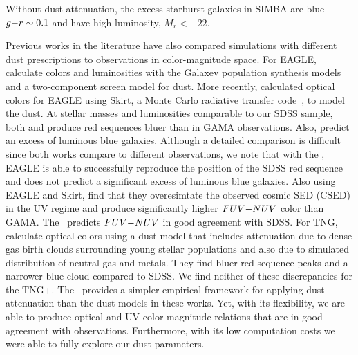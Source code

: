 Without dust attenuation, the excess starburst galaxies in SIMBA are blue
$g{-}r\sim0.1$ and have high luminosity, $M_r < -22$.

Previous works in the literature have also compared simulations with different
dust prescriptions to observations in color-magnitude space. For EAGLE, 
\cite{trayford2015} calculate colors and luminosities with the {\sc Galaxev}
population synthesis models and a two-component screen model for dust. More
recently, \cite{trayford2017} calculated optical colors for EAGLE using {\sc
Skirt}, a Monte Carlo radiative transfer code~\citep{camps2015}, to model the
dust. At stellar masses and luminosities comparable to our SDSS sample, both 
\cite{trayford2015} and \cite{trayford2017} produce red sequences bluer than 
in GAMA observations. Also, \cite{trayford2015} predict an excess of luminous 
blue galaxies. Although a detailed comparison is difficult since both works 
compare to different observations, we note that with the \eda, EAGLE is able 
to successfully reproduce the position of the SDSS red sequence and does not 
predict a significant excess of luminous blue galaxies. Also using EAGLE and 
{\sc Skirt}, \cite{baes2019} find that they overesimtate the observed cosmic 
SED (CSED) in the UV regime and produce significantly higher $FUV{-}NUV$ color 
than GAMA. The \eda~predicts $FUV{-}NUV$ in good agreement with SDSS. 
For TNG, \cite{nelson2018} calculate optical colors using a dust model that
includes attenuation due to dense gas birth clouds surrounding young stellar
populations and also due to simulated distribution of neutral gas and metals.
They find bluer red sequence peaks and a narrower blue cloud compared to SDSS.
We find neither of these discrepancies for the TNG+\eda. The \eda~provides a
simpler empirical framework for applying dust attenuation than the dust models
in these works. Yet, with its flexibility, we are able to produce optical and
UV color-magnitude relations that are in good agreement with observations.
Furthermore, with its low computation costs we were able to fully
explore our dust parameters. 

